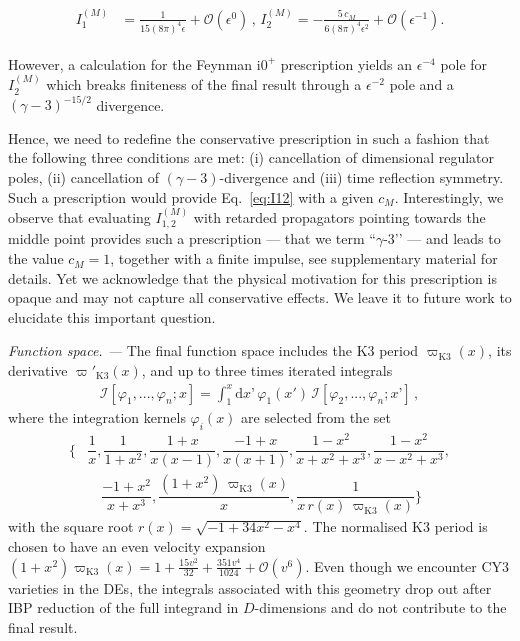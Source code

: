 \documentclass[twocolumn,superscriptaddress,amsmath, amssymb, amsfonts,preprintnumbers,aps,prd,longbibliography,nofootinbib]{revtex4-2}
\renewcommand{\sec}[1]{\textit{#1. --- }}
\def\eps{\epsilon}
\renewcommand{\i}{\ensuremath{\mathrm{i}}}
\newcommand{\iO}{\i 0^{+}}
\def\eps{\epsilon}
\def\eqn#1{Eq.~\eqref{#1}}
\begin{document}
\begin{align}
\label{eq:I12}
\begin{aligned}
I^{(M)}_{1}&=  \frac{1}{ 15 (8 \pi)^4 \epsilon } +\mathcal{O}(\epsilon^0)\,, \,
I^{(M)}_{2}= - \frac{5\, c_{M}}{ 6 (8 \pi)^4  \epsilon^{2}}
 +\mathcal{O}(\epsilon^{-1}) .
\end{aligned}
\end{align}

However, a calculation for the Feynman $\iO$ prescription
yields an $\epsilon^{-4}$ pole for $I^{(M)}_{2}$ which breaks finiteness of the final
result through a $\eps^{-2}$ pole and a $(\gamma-3)^{-15/2}$ divergence.

Hence, we need to redefine the conservative prescription in such a fashion
that the following three conditions are met: (i) cancellation of dimensional regulator poles,
(ii) cancellation of $(\gamma-3)$-divergence and (iii) time reflection symmetry.
Such a prescription would provide \eqn{eq:I12} with a given $c_{M}$.
Interestingly, we observe that evaluating $I^{(M)}_{1,2}$ with retarded
propagators pointing towards the middle point
provides such a prescription --- that we term ``$\gamma$-3’’ --- and leads to the value
$c_{M}=1$, together with a finite impulse, see supplementary material for details.
Yet we acknowledge that the physical motivation for this prescription is opaque and may not capture all conservative effects. We leave it to future work to elucidate this
important question.




\sec{Function space}
The final function space includes the K3 period
$\varpi_\text{K3}(x)$, its derivative $\varpi'_\text{K3}(x)$, and up to three times iterated integrals
\begin{align}\label{IIdef}
  \mathcal I [\varphi_1,...,\varphi_n;x]=\int_1^x \mathrm dx’\,\varphi_1(x')\,\mathcal{I}[\varphi_2,...,\varphi_n;x’] \, ,
\end{align}
where the integration kernels $\varphi_i(x)$ are selected from the set
\begin{align}
	\bigg\{ &\dfrac{1}{x}, \dfrac{1}{1+x^2}, \dfrac{1+x}{x(x-1)}, \dfrac{-1+x}{x(x+1)}, \dfrac{1-x^2}{x+x^2+x^3}, \dfrac{1-x^2}{x-x^2+x^3}, \nonumber \\
	&\quad \dfrac{-1+x^2}{x+x^3}, \dfrac{(1+x^2)\,\varpi_\text{K3}(x)}{x}, \dfrac{1}{x \,r(x)\,\varpi_\text{K3}(x)}\bigg\}
\end{align}
with the square root $r(x) = \sqrt{-1+34x^2-x^4}$. The normalised K3 period is chosen to have an even velocity expansion $(1+x^2) \varpi_\text{K3}(x) =1+\frac{15 v^2}{32}+\frac{351 v^4}{1024}+\mathcal O(v^6)$.
Even though we encounter CY3 varieties in the DEs, the integrals associated with this geometry drop out after IBP reduction of the full integrand in $D$-dimensions and do not contribute to the final result.
\end{document}
